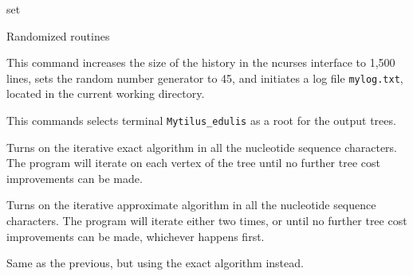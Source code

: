 \begin{command}{set}{}
\begin{arguments}
\begin{argumentgroup}{Randomized routines}
            \end{argumentgroup}
	\end{arguments}


    \begin{poyexamples}
            {This command increases the size of the history in the ncurses
            interface to 1,500 lines, sets the random number generator to 45,
            and initiates a log file \texttt{mylog.txt}, located in the current
            working directory.}
            
            {This commands selects terminal \texttt{Mytilus\_edulis} as a root
            for the output trees.}
            
            {Turns on the iterative exact algorithm in all the nucleotide
            sequence characters. The program will iterate on each vertex of the
            tree until no further tree cost improvements can be made.}

            {Turns on the iterative approximate algorithm in all the nucleotide
            sequence characters. The program will iterate either two times, or
            until no further tree cost improvements can be made, whichever
            happens first.}

            {Same as the previous, but using the exact algorithm instead.}
     \end{poyexamples}
     
	\begin{poyalso}
	\end{poyalso}

\end{command}

